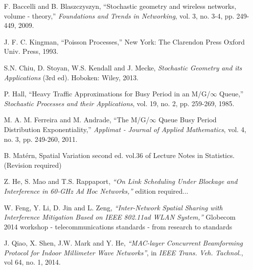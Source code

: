 \documentclass[10pt, conference, letterpaper]{IEEEtran}
\newcommand*{\Rom}[1]{\uppercase\expandafter{\romannumeral #1\relax}} %
\begin{document}
\begin{thebibliography}{50}
F. Baccelli and B. Blaszczyszyn, ``Stochastic geometry and wireless networks, volume \Rom{1} - theory,'' \emph{Foundations and Trends in Networking}, vol. 3, no. 3-4, pp. 249-449, 2009.

J. F. C. Kingman, ``Poisson Processes,'' New York: The Clarendon Press Oxford Univ. Press, 1993.

S.N. Chiu, D. Stoyan, W.S. Kendall and J. Mecke, \emph{Stochastic Geometry and its Applications} (3rd ed). Hoboken: Wiley, 2013. 

P. Hall, ``Heavy Traffic Approximations for Busy Period in an M/G/$\infty$ Queue,'' \emph{Stochastic Processes and their Applications}, vol. 19, no. 2, pp. 259-269, 1985.

M. A. M. Ferreira and M. Andrade, ``The M/G/$\infty$ Queue Busy Period Distribution Exponentiality,'' \emph{Applimat - Journal of Applied Mathematics}, vol. 4, no. 3, pp. 249-260, 2011.


B. Mat\'ern, Spatial Variation second ed. vol.36 of Lecture Notes in Statistics. (Revision required)





Z. He, S. Mao and T.S. Rappaport, \emph{``On Link Scheduling Under Blockage and Interference in 60-GHz Ad Hoc Networks,''} edition required...

W. Feng, Y. Li, D. Jin and L. Zeng, \emph{``Inter-Network Spatial Sharing with Interference Mitigation Based on IEEE 802.11ad WLAN System,''} Globecom 2014 workshop - telecommunications standards - from research to standards

J. Qiao, X. Shen, J.W. Mark and Y. He, \emph{``MAC-layer Concurrent Beamforming Protocol for Indoor Millimeter Wave Networks''}, in \emph{IEEE Trans. Veh. Tachnol.}, vol 64, no. 1, 2014. 

\end{thebibliography}
\end{document}
